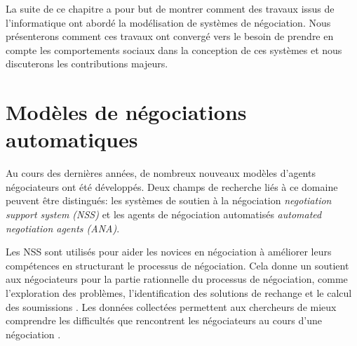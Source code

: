 	
	La suite de ce chapitre a pour but de montrer comment des travaux issus de l'informatique ont abordé la modélisation de systèmes de négociation. Nous présenterons comment ces travaux ont convergé vers le besoin de prendre en compte les comportements sociaux dans la conception de ces systèmes et nous discuterons les contributions majeurs.  
	
	
	


	\section{Modèles de négociations automatiques}
	
	Au cours des dernières années, de nombreux nouveaux modèles d'agents négociateurs ont été développés. Deux champs de recherche liés à ce domaine peuvent être distingués: les systèmes de soutien à la négociation \emph{ negotiation support system (NSS)} et les agents de négociation automatisés \emph{automated negotiation agents (ANA)}.
	

	 Les NSS sont utilisés pour aider les novices en négociation à améliorer leurs compétences en structurant le processus de négociation. Cela donne un soutient aux négociateurs pour la partie rationnelle du processus de négociation, comme l'exploration des problèmes, l'identification des solutions de rechange et le calcul des soumissions \cite{hindriks2008creating}. Les données collectées permettent aux chercheurs de mieux comprendre les difficultés que rencontrent les négociateurs au cours d'une négociation \cite{jonker2012negotiating}. 
	 
